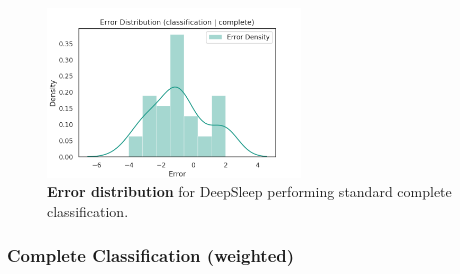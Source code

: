 \documentclass[11pt]{scrartcl}
\begin{document}
\begin{figure}[hbt]
	\centering
	\includegraphics[width=0.6\textwidth,center]{img/learning/original_gdansk_sleepnet_classification_complete_none_unweighted_error_distribution.png}
	\caption{\textcolor{viridis5}{\textbf{Error distribution}} for DeepSleep performing standard complete classification.}
	\label{fig:original_gdansk_sleepnet_classification_complete_none_unweighted_error_distribution}
\end{figure}

\FloatBarrier



\FloatBarrier
\subsubsection{Complete Classification (weighted)}
\end{document}
